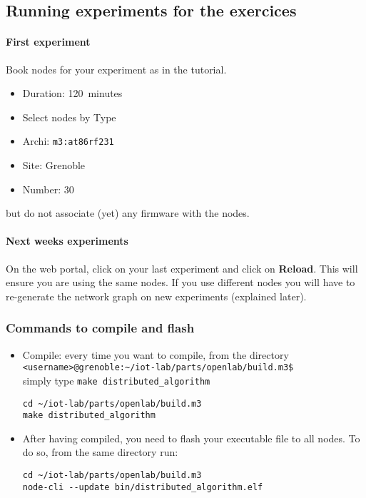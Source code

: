 \documentclass{article}
\begin{document}
\subsection{Running experiments for the exercices}

\paragraph{First experiment} Book nodes for your experiment as in the tutorial.
\begin{itemize}
\item Duration: 120~minutes
\item Select nodes by Type
\item Archi: \texttt{m3:at86rf231}
\item Site: Grenoble
\item Number: $30$
\end{itemize}
but do not associate (yet) any firmware with the nodes.

\paragraph{Next weeks experiments} On the web portal, click on your last
experiment and click on \textbf{Reload}. This will ensure you are using the
same nodes. If you use different nodes you will have to re-generate the network
graph on new experiments (explained later).

\subsubsection{Commands to compile and flash}

\begin{itemize}

\item Compile: every time you want to compile, from the directory\\
    \verb=<username>@grenoble:~/iot-lab/parts/openlab/build.m3$=\\
    simply type \verb=make distributed_algorithm=

    \begin{verbatim}cd ~/iot-lab/parts/openlab/build.m3
make distributed_algorithm\end{verbatim}

\item After having compiled, you need to flash your executable file to all nodes.
    To do so, from the same directory run:
    \begin{verbatim}cd ~/iot-lab/parts/openlab/build.m3
node-cli --update bin/distributed_algorithm.elf\end{verbatim}
\end{itemize}
\end{document}

